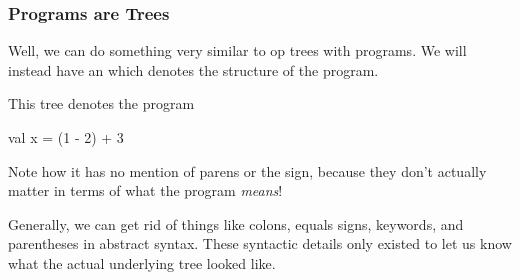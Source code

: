 \documentclass[aspectratio=169]{beamer}
\begin{document}
\begin{frame}[fragile]
  \frametitle{Programs are Trees}

  Well, we can do something very similar to op trees with programs. We will
  instead have an  which denotes the structure
  of the program.

  \pause
  \vspace{\fill}

  \begin{center}
    \begin{minipage}{0.6\textwidth}
      \raggedright
      This tree denotes the program
      \begin{codeblock}
        val x = (1 - 2) + 3
      \end{codeblock}

      Note how it has no mention of parens or the \code{=} sign, because they don't
      actually matter in terms of what the program \textit{means}!

      Generally, we can get rid of things like colons, equals signs, keywords,
      and parentheses in abstract syntax. These syntactic details only existed
      to let us know what the actual underlying tree looked like.
    \end{minipage}
    \begin{minipage}{0.38\textwidth}
      \centering
    \end{minipage}
  \end{center}
\end{frame}
\end{document}

